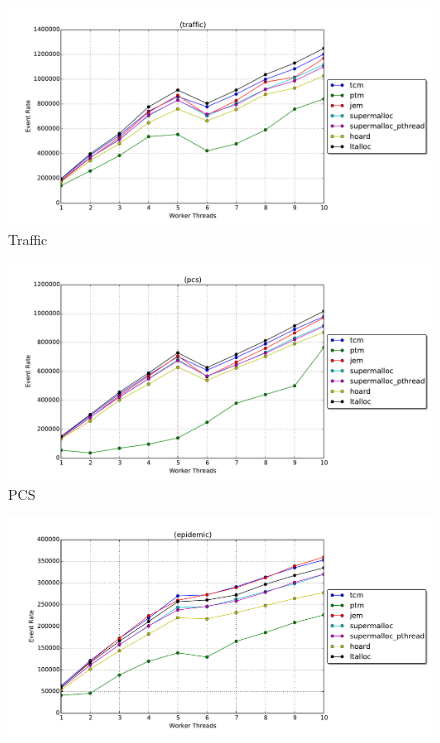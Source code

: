 \documentclass[11pt]{book}
\begin{document}
\begin{figure}
  \begin{minipage}{.5\textwidth}
    \begin{center}
      \includegraphics[width=\textwidth,keepaspectratio,quiet]{figs/memory_allocation/traffic_eventrate.pdf} \\
      Traffic \\
    \end{center}
  \end{minipage}%
  \hfill
  \begin{minipage}{.5\textwidth}
    \begin{center}
      \includegraphics[width=\textwidth,keepaspectratio,quiet]{figs/memory_allocation/pcs_eventrate.pdf} \\
      PCS \\
    \end{center}
  \end{minipage}
  \begin{minipage}{.5\textwidth}
    \begin{center}
      \includegraphics[width=\textwidth,keepaspectratio,quiet]{figs/memory_allocation/epidemic_eventrate.pdf} \\

\end{center}
\end{minipage}
\end{figure}
\end{document}
